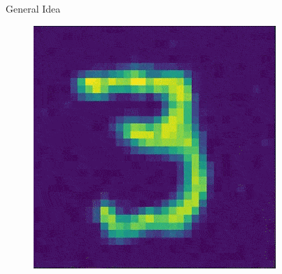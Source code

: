 \documentclass{beamer}
\begin{document}
\begin{frame}{General Idea}
{\begin{figure}
\begin{minipage}{0.2\textwidth}
                \includegraphics[width=\textwidth]{imgs/frame1.png}
            \end{minipage}%
\end{figure}}
\end{frame}
\end{document}
